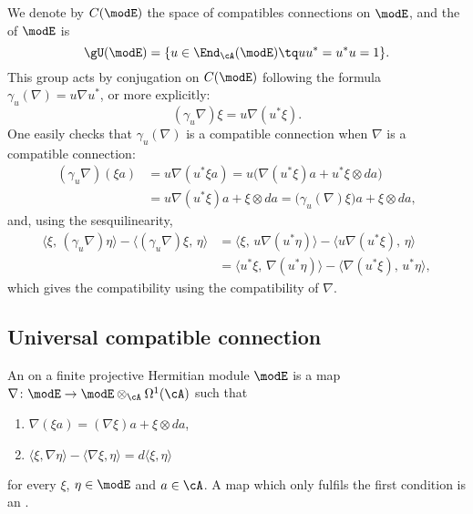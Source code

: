 We denote by $C(\modE)$ the space of compatibles connections on $\modE$, and the  of $\modE$ is 
\[ 
  \gU(\modE)=\{ u\in\End_{\cA}(\modE)\tq uu^*=u^*u=1 \}.
\]
This group acts by conjugation on $C(\modE)$ following the formula $\gamma_u(\nabla)=u\nabla u^*$, or more explicitly:
\begin{equation}
(\gamma_u\nabla)\xi=u\nabla(u^*\xi).
\end{equation}
One easily checks that $\gamma_u(\nabla)$ is a compatible connection when $\nabla$ is a compatible connection:
\[ 
\begin{split}
(\gamma_u\nabla)(\xi a)&=u\nabla(u^*\xi a)=u\big( \nabla(u^*\xi)a+u^*\xi\otimes da \big)\\
		&=u\nabla(u^*\xi)a+\xi\otimes da=\big( \gamma_u(\nabla)\xi \big)a+\xi\otimes da,
\end{split}  
\]
and, using the sesquilinearity, 
\[ 
\begin{split}
   \langle \xi,\,(\gamma_u\nabla)\eta\rangle-\langle (\gamma_u\nabla)\xi,\,\eta\rangle&=\langle \xi,\,u\nabla(u^*\eta)\rangle-\langle u\nabla(u^*\xi),\,\eta\rangle\\
		&=\langle u^*\xi,\,\nabla(u^*\eta)\rangle-\langle \nabla(u^*\xi),\,u^*\eta\rangle,
\end{split}  
\]
which gives the compatibility using the compatibility of  $\nabla$.

\subsection{Universal compatible connection}

An  on a finite projective Hermitian module $\modE$ is a map $\nabla\colon \modE\to \modE\otimes_{\cA}\Omega^1(\cA)$ such that
\begin{enumerate}
\item $\nabla(\xi a)=(\nabla \xi)a+\xi\otimes da$,
\item $\langle \xi, \nabla\eta\rangle -\langle \nabla\xi, \eta\rangle =d\langle \xi, \eta\rangle$
\end{enumerate}
for every $\xi$, $\eta\in\modE$ and $a\in\cA$. A map which only fulfils the first condition is an .

